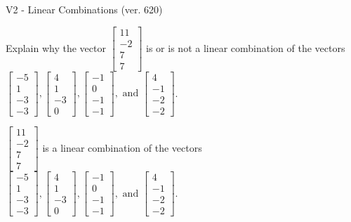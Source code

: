 \begin{exercise}
  \begin{exerciseTitle}V2 - Linear Combinations (ver. 620)\end{exerciseTitle}
  \begin{exerciseStatement}
    Explain why the vector \(\left[\begin{array}{c}
11 \\
-2 \\
7 \\
7
\end{array}\right]\)  is or is not a linear 
	combination of the vectors \(\left[\begin{array}{c}
-5 \\
1 \\
-3 \\
-3
\end{array}\right] , \left[\begin{array}{c}
4 \\
1 \\
-3 \\
0
\end{array}\right] , \left[\begin{array}{c}
-1 \\
0 \\
-1 \\
-1
\end{array}\right] , \text{ and } \left[\begin{array}{c}
4 \\
-1 \\
-2 \\
-2
\end{array}\right]\).
	


  \end{exerciseStatement}
  \begin{exerciseAnswer}
   \(\left[\begin{array}{c}
11 \\
-2 \\
7 \\
7
\end{array}\right]\) 
  	 is  
	a linear combination of the vectors \(\left[\begin{array}{c}
-5 \\
1 \\
-3 \\
-3
\end{array}\right] , \left[\begin{array}{c}
4 \\
1 \\
-3 \\
0
\end{array}\right] , \left[\begin{array}{c}
-1 \\
0 \\
-1 \\
-1
\end{array}\right] , \text{ and } \left[\begin{array}{c}
4 \\
-1 \\
-2 \\
-2
\end{array}\right]\).


\end{exerciseAnswer}
\end{exercise}
